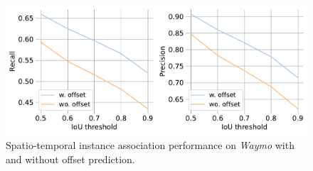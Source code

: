 \begin{figure}[t]
     \centering
        \includegraphics[width=1.0\columnwidth]{figs/figure/association.pdf}
       \caption{Spatio-temporal instance association performance on \emph{Waymo} with and without offset prediction.}
   \label{fig:supp_association}
\end{figure}